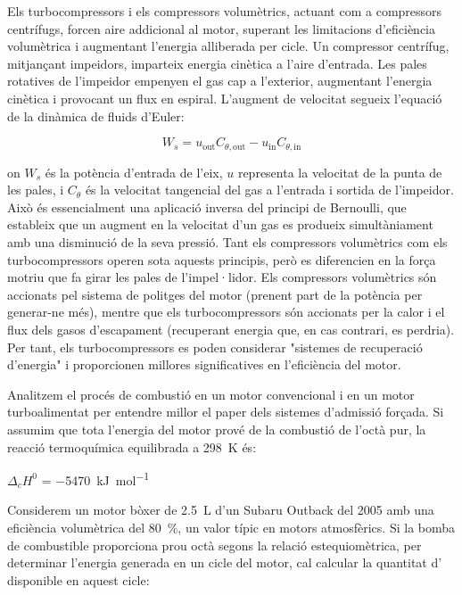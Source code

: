  

\begin{mybox}[title=Turbocompressors front compressors volumètrics]
    Els turbocompressors i els compressors volumètrics, actuant com a compressors centrífugs, forcen aire addicional al motor, superant les limitacions d'eficiència volumètrica i augmentant l'energia alliberada per cicle. Un compressor centrífug, mitjançant impe\lgem idors, imparteix energia cinètica a l'aire d'entrada. Les pales rotatives de l'impe\lgem idor empenyen el gas cap a l'exterior, augmentant l'energia cinètica i provocant un flux en espiral. L'augment de velocitat segueix l'equació de la dinàmica de fluids d'Euler:

\begin{equation}
    W_s = u_{\text{out}} C_{\theta,\text{out}} - u_{\text{in}} C_{\theta,\text{in}}
\end{equation}

on $W_s$ és la potència d'entrada de l'eix, $u$ representa la velocitat de la punta de les pales, i $C_{\theta}$ és la velocitat tangencial del gas a l'entrada i sortida de l'impe\lgem idor.
Això és essencialment una aplicació inversa del principi de Bernoulli, que estableix que un augment en la velocitat d'un gas es produeix simultàniament amb una disminució de la seva pressió. Tant els compressors volumètrics com els turbocompressors operen sota aquests principis, però es diferencien en la força motriu que fa girar les pales de l'impel·lidor. Els compressors volumètrics són accionats pel sistema de politges del motor (prenent part de la potència per generar-ne més), mentre que els turbocompressors són accionats per la calor i el flux dels gasos d'escapament (recuperant energia que, en cas contrari, es perdria). Per tant, els turbocompressors es poden considerar "sistemes de recuperació d'energia" i proporcionen millores significatives en l'eficiència del motor.
\end{mybox}

Analitzem el procés de combustió en un motor convencional i en un motor turboalimentat per entendre millor el paper dels sistemes d'admissió forçada. Si assumim que tota l'energia del motor prové de la combustió de l'octà pur, la reacció termoquímica equilibrada a \qty{298}{\kelvin} és:

     \quad $\Delta_cH^0$ = \qty{-5470}{\kilo\joule\per\mole}

Considerem un motor bòxer de \qty{2.5}{\liter} d'un Subaru Outback del 2005 amb una eficiència volumètrica del \qty{80}{\percent}, un valor típic en motors atmosfèrics. Si la bomba de combustible proporciona prou octà segons la relació estequiomètrica, per determinar l'energia generada en un cicle del motor, cal calcular la quantitat d' disponible en aquest cicle:

